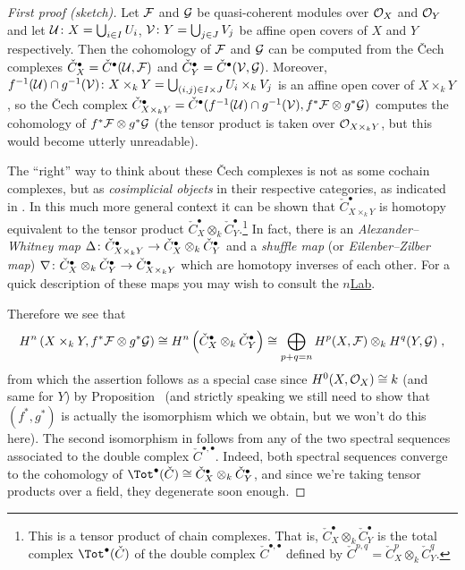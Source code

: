 \documentclass[a4paper,parskip=half,numbers=enddot, DIV=12]{scrreprt}
\begin{document}
\begin{proof}[First proof (sketch)]
	Let $\mathcal{F}$ and $\mathcal{G}$ be quasi-coherent modules over $\mathcal{O}_X$ and $\mathcal{O}_Y$ and let $\mathcal{U}\colon X=\bigcup_{i\in I}U_i$, $\mathcal{V}\colon Y=\bigcup_{j\in J}V_j$ be affine open covers of $X$ and $Y$ respectively. Then the cohomology of $\mathcal{F}$ and $\mathcal{G}$ can be computed from the \v Cech complexes $\check{C}_X^\bullet=\check{C}^\bullet(\mathcal{U},\mathcal{F})$ and $\check{C}_Y^\bullet=\check{C}^\bullet(\mathcal{V},\mathcal{G})$. Moreover, $f^{-1}(\mathcal{U})\cap g^{-1}(\mathcal{V})\colon X\times_kY=\bigcup_{(i,j)\in I\times J}U_i\times_kV_j$ is an affine open cover of $X\times_kY$, so the \v Cech complex $\check{C}_{X\times_kY}^\bullet=\check{C}^\bullet(f^{-1}(\mathcal{U})\cap g^{-1}(\mathcal{V}),f^*\mathcal{F}\otimes g^*\mathcal{G})$ computes the cohomology of $f^*\mathcal{F}\otimes g^*\mathcal{G}$ (the tensor product is taken over $\mathcal{O}_{X\times_kY}$, but this would become utterly unreadable).
	
	The ``right'' way to think about these \v Cech complexes is not as some cochain complexes, but as \emph{cosimplicial objects} in their respective categories, as indicated in \cite[Remark~1.2.1]{alggeo2}. In this much more general context it can be shown that $\check{C}_{X\times_kY}^\bullet$ is homotopy equivalent to the tensor product $\check{C}_X^\bullet\otimes_k\check{C}_Y^\bullet$.\footnote{This is a tensor product of chain complexes. That is, $\check{C}_X^\bullet\otimes_k\check{C}_Y^\bullet$ is the total complex $\Tot^\bullet(\check{C})$ of the double complex $\check{C}^{\bullet,\bullet}$ defined by $\check{C}^{p,q}=\check{C}_X^p\otimes_k\check{C}_Y^q$.} In fact, there is an \emph{Alexander--Whitney map} $\Delta\colon \check{C}_{X\times_kY}^\bullet\morphism\check{C}_X^\bullet\otimes_k\check{C}_Y^\bullet$ and a \emph{shuffle map} (or \emph{Eilenber--Zilber map}) $\nabla\colon\check{C}_X^\bullet\otimes_k\check{C}_Y^\bullet\morphism\check{C}_{X\times_kY}^\bullet$ which are homotopy inverses of each other. For a quick description of these maps you may wish to consult the \href{https://ncatlab.org/nlab/show/Alexander-Whitney+map}{$n$Lab}.
	
	Therefore we see that
	\begin{align}\lbl{eq:Künneth}
		H^n\left(X\times_kY,f^*\Ff\otimes g^*\Gg\right)\cong H^n\left(\check{C}_X^\bullet\otimes_k\check{C}_Y^\bullet\right)\cong \bigoplus_{p+q=n}H^p(X,\Ff)\otimes_kH^q(Y,\Gg)\;,
	\end{align}
	from which the assertion follows as a special case since $H^0(X,\mathcal{O}_X)\cong k$ (and same for $Y$) by Proposition~ (and strictly speaking we still need to show that $(f^*,g^*)$ is actually the isomorphism which we obtain, but we won't do this here). The second isomorphism in  follows from any of the two spectral sequences associated to the double complex $\check{C}^{\bullet,\bullet}$. Indeed, both spectral sequences converge to the cohomology of $\Tot^\bullet(\check{C})\cong \check{C}_X^\bullet\otimes_k\check{C}_Y^\bullet$, and since we're taking tensor products over a field, they degenerate soon enough.
\end{proof}
\end{document}
